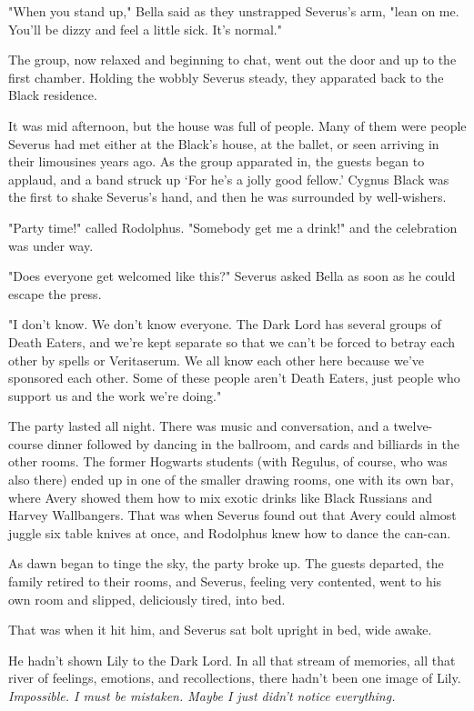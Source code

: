 \documentclass[a4paper,11pt]{article}
\begin{document}
"When you stand up," Bella said as they unstrapped Severus's arm, "lean on me. You'll be dizzy and feel a little sick. It's normal."

The group, now relaxed and beginning to chat, went out the door and up to the first chamber. Holding the wobbly Severus steady, they apparated back to the Black residence.

It was mid afternoon, but the house was full of people. Many of them were people Severus had met either at the Black's house, at the ballet, or seen arriving in their limousines years ago. As the group apparated in, the guests began to applaud, and a band struck up `For he's a jolly good fellow.' Cygnus Black was the first to shake Severus's hand, and then he was surrounded by well-wishers.

"Party time!" called Rodolphus. "Somebody get me a drink!" and the celebration was under way.

"Does everyone get welcomed like this?" Severus asked Bella as soon as he could escape the press.

"I don't know. We don't know everyone. The Dark Lord has several groups of Death Eaters, and we're kept separate so that we can't be forced to betray each other by spells or Veritaserum. We all know each other here because we've sponsored each other. Some of these people aren't Death Eaters, just people who support us and the work we're doing."

The party lasted all night. There was music and conversation, and a twelve-course dinner followed by dancing in the ballroom, and cards and billiards in the other rooms. The former Hogwarts students (with Regulus, of course, who was also there) ended up in one of the smaller drawing rooms, one with its own bar, where Avery showed them how to mix exotic drinks like Black Russians and Harvey Wallbangers. That was when Severus found out that Avery could almost juggle six table knives at once, and Rodolphus knew how to dance the can-can.

As dawn began to tinge the sky, the party broke up. The guests departed, the family retired to their rooms, and Severus, feeling very contented, went to his own room and slipped, deliciously tired, into bed.

That was when it hit him, and Severus sat bolt upright in bed, wide awake.

He hadn't shown Lily to the Dark Lord. In all that stream of memories, all that river of feelings, emotions, and recollections, there hadn't been one image of Lily. \emph{Impossible. I must be mistaken. Maybe I just didn't notice everything.}
\end{document}

